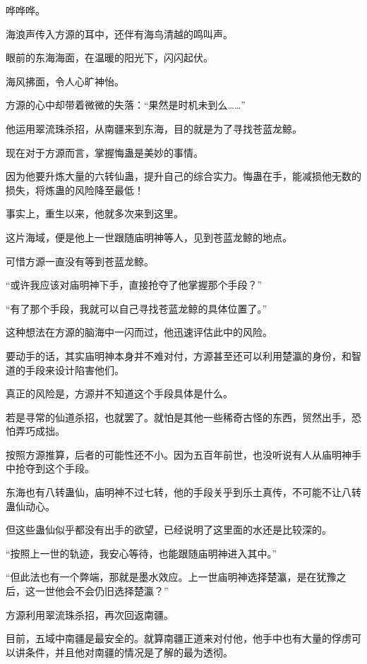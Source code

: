 
\begin{this_body}

哗哗哗。

海浪声传入方源的耳中，还伴有海鸟清越的鸣叫声。

眼前的东海海面，在温暖的阳光下，闪闪起伏。

海风拂面，令人心旷神怡。

方源的心中却带着微微的失落：“果然是时机未到么……”

他运用翠流珠杀招，从南疆来到东海，目的就是为了寻找苍蓝龙鲸。

现在对于方源而言，掌握悔蛊是美妙的事情。

因为他要升炼大量的六转仙蛊，提升自己的综合实力。悔蛊在手，能减损他无数的损失，将炼蛊的风险降至最低！

事实上，重生以来，他就多次来到这里。

这片海域，便是他上一世跟随庙明神等人，见到苍蓝龙鲸的地点。

可惜方源一直没有等到苍蓝龙鲸。

“或许我应该对庙明神下手，直接抢夺了他掌握那个手段？”

“有了那个手段，我就可以自己寻找苍蓝龙鲸的具体位置了。”

这种想法在方源的脑海中一闪而过，他迅速评估此中的风险。

要动手的话，其实庙明神本身并不难对付，方源甚至还可以利用楚瀛的身份，和智道的手段来设计陷害他们。

真正的风险是，方源并不知道这个手段具体是什么。

若是寻常的仙道杀招，也就罢了。就怕是其他一些稀奇古怪的东西，贸然出手，恐怕弄巧成拙。

按照方源推算，后者的可能性还不小。因为五百年前世，也没听说有人从庙明神手中抢夺到这个手段。

东海也有八转蛊仙，庙明神不过七转，他的手段关乎到乐土真传，不可能不让八转蛊仙动心。

但这些蛊仙似乎都没有出手的欲望，已经说明了这里面的水还是比较深的。

“按照上一世的轨迹，我安心等待，也能跟随庙明神进入其中。”

“但此法也有一个弊端，那就是墨水效应。上一世庙明神选择楚瀛，是在犹豫之后，这一世他会不会仍旧选择楚瀛？”

方源利用翠流珠杀招，再次回返南疆。

目前，五域中南疆是最安全的。就算南疆正道来对付他，他手中也有大量的俘虏可以讲条件，并且他对南疆的情况是了解的最为透彻。


\end{this_body}
